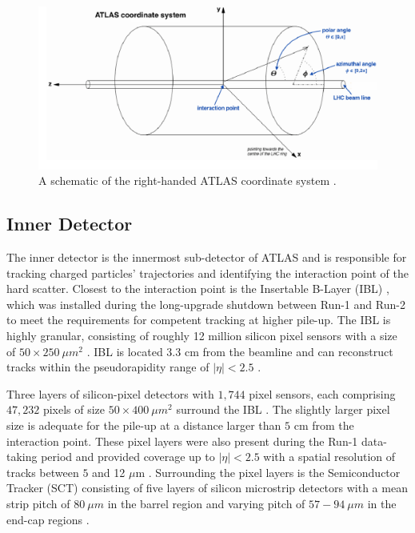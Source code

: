 \begin{figure}[!htb]
    \centering
    \includegraphics[width=.98\linewidth]{figures/LHC/ATLAS_CoordinateSys.png}
    \caption{ A schematic of the right-handed ATLAS coordinate system \cite{ATLAS_CoordSys}.\label{fig:ATLAS_CS}}
\end{figure}

\subsection{Inner Detector}
\label{subsec:ID}
The inner detector is the innermost sub-detector of ATLAS and is responsible for tracking charged particles' trajectories and identifying the interaction point of the hard scatter. Closest to the interaction point is the Insertable B-Layer (IBL) \cite{ATLAS_IBL}, which was installed during the long-upgrade shutdown between Run-1 and Run-2 to meet the requirements for competent tracking at higher pile-up. The IBL is highly granular, consisting of roughly 12 million silicon pixel sensors with a size of $50\times 250 ~\mu m^2$ \cite{ATLAS_IBL}. IBL is located $3.3$ cm from the beamline and can reconstruct tracks within the pseudorapidity range of $|\eta|<2.5$ \cite{ATLAS_IBL}. 

Three layers of silicon-pixel detectors with $1,744$ pixel sensors, each comprising $47,232$ pixels of size $50\times 400 ~\mu m^2$ surround the IBL \cite{ID_Pixel}. The slightly larger pixel size is adequate for the pile-up at a distance larger than $5$ cm from the interaction point. These pixel layers were also present during the Run-1 data-taking period and provided coverage up to $|\eta|<2.5$ with a spatial resolution of tracks between $5$ and 12 $\mu$m \cite{ID_Pixel}. Surrounding the pixel layers is the Semiconductor Tracker (SCT) consisting of five layers of silicon microstrip detectors with a mean strip pitch of $80 ~\mu m$ in the barrel region and varying pitch of  $57-94 ~\mu m$ in the end-cap regions \cite{ID_Strips}. 

